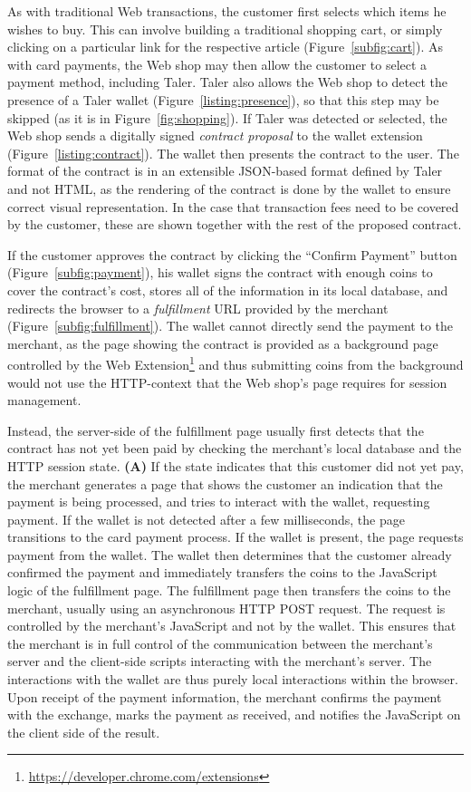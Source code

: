 \documentclass{IEEEtran}
\begin{document}
As with traditional Web transactions, the customer first selects which
items he wishes to buy.  This can involve building a traditional
shopping cart, or simply clicking on a particular link for the
respective article (Figure~\ref{subfig:cart}).  As with card payments,
the Web shop may then allow the customer to select a payment method,
including Taler.  Taler also allows the Web shop to detect
the presence of a Taler wallet (Figure~\ref{listing:presence}), so
that this step may be skipped (as it is in Figure~\ref{fig:shopping}).
If Taler was detected or selected, the Web shop sends a digitally
signed {\em contract proposal} to the wallet extension
(Figure~\ref{listing:contract}).  The wallet then presents the
contract to the user.  The format of the contract is in an extensible
JSON-based format defined by Taler and not HTML, as the
rendering of the contract is done by the wallet to ensure correct
visual representation.  In the case that transaction fees need to be
covered by the customer, these are shown together with the rest of the
proposed contract.

If the customer approves the contract by clicking the ``Confirm
Payment'' button (Figure~\ref{subfig:payment}), his wallet signs the
contract with enough coins to cover the contract's cost, stores all of
the information in its local database, and redirects the browser to a
{\em fulfillment} URL provided by the merchant
(Figure~\ref{subfig:fulfillment}).  The wallet cannot directly send
the payment to the merchant, as the page showing the contract is
provided as a background page controlled by the Web Extension\footnote{\url{https://developer.chrome.com/extensions}} and thus
submitting coins from the background would not use the HTTP-context
that the Web shop's page requires for session management.

Instead, the server-side of the fulfillment page usually first detects
that the contract has not yet been paid by checking the merchant's
local database and the HTTP session state.  {\bf (A)} If the state
indicates that this customer did not yet pay, the merchant generates a
page that shows the customer an indication that the payment is being
processed, and tries to interact with the wallet, requesting payment.
If the wallet is not detected after a few milliseconds, the page
transitions to the card payment process.  If the wallet is present,
the page requests payment from the wallet.  The wallet then determines
that the customer already confirmed the payment and immediately
transfers the coins to the JavaScript logic of the fulfillment page.
The fulfillment page then transfers the coins to the merchant, usually
using an asynchronous HTTP POST request.  The request is controlled by
the merchant's JavaScript and not by the wallet. This ensures that the
merchant is in full control of the communication between the
merchant's server and the client-side scripts interacting with the
merchant's server.  The interactions with the wallet are thus purely
local interactions within the browser.  Upon receipt of the payment
information, the merchant confirms the payment with the exchange,
marks the payment as received, and notifies the JavaScript on the
client side of the result.
\end{document}
